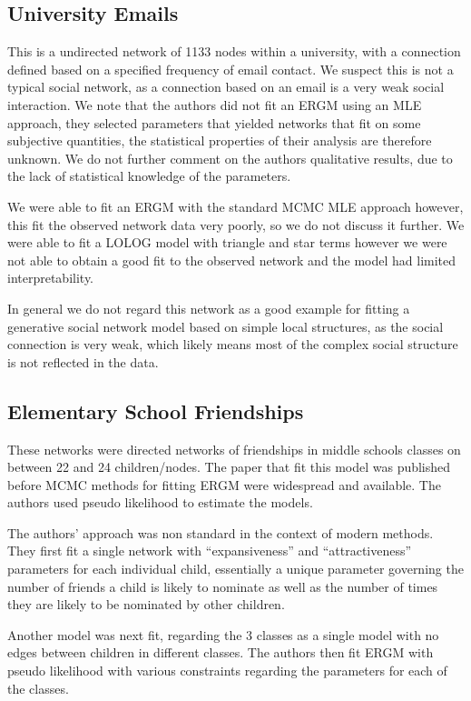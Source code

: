 \documentclass[
]{statsoc}
\begin{document}
\subsection{University Emails}

This is a undirected network of 1133 nodes within a university, with a
connection defined based on a specified frequency of email contact. We
suspect this is not a typical social network, as a connection based on
an email is a very weak social interaction. We note that the authors did
not fit an ERGM using an MLE approach, they selected parameters that
yielded networks that fit on some subjective quantities, the statistical
properties of their analysis are therefore unknown. We do not further
comment on the authors qualitative results, due to the lack of
statistical knowledge of the parameters.

We were able to fit an ERGM with the standard MCMC MLE approach however,
this fit the observed network data very poorly, so we do not discuss it
further. We were able to fit a LOLOG model with triangle and star terms
however we were not able to obtain a good fit to the observed network
and the model had limited interpretability.

In general we do not regard this network as a good example for fitting a
generative social network model based on simple local structures, as the
social connection is very weak, which likely means most of the complex
social structure is not reflected in the data.

\subsection{Elementary School Friendships}

These networks were directed networks of friendships in middle schools
classes on between 22 and 24 children/nodes. The paper that fit this
model was published before MCMC methods for fitting ERGM were widespread
and available. The authors used pseudo likelihood to estimate the
models.

The authors' approach was non standard in the context of modern methods.
They first fit a single network with ``expansiveness'' and
``attractiveness'' parameters for each individual child, essentially a
unique parameter governing the number of friends a child is likely to
nominate as well as the number of times they are likely to be nominated
by other children.

Another model was next fit, regarding the 3 classes as a single model
with no edges between children in different classes. The authors then
fit ERGM with pseudo likelihood with various constraints regarding the
parameters for each of the classes.
\end{document}

